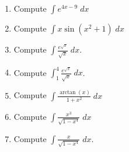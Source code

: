 \documentclass[11pt,fleqn]{article}
\newcommand{\be}{\begin{enumerate}}
\newcommand{\ee}{\end{enumerate}}
\begin{document}
\setlength{\parindent}{0cm}
\renewcommand{\headrulewidth}{0pt}
\newcommand{\blank}[1]{\rule{#1}{0.75pt}}
\renewcommand{\d}{\displaystyle}
\vspace*{-0.7in}
\begin{center}
  \Large {}
\end{center}

\be
\item Compute $\d{ \int e^{4x-9}\; dx}$
\vfill
\item Compute $\d \int x \sin(x^2+1)\; dx$
\vfill
\item Compute $\d \int \frac{e^{\sqrt{x}}}{\sqrt{x}}\; dx$.
\vfill
\item Compute $\d \int_1^4 \frac{e^{\sqrt{x}}}{\sqrt{x}}\; dx$.
\vfill
\newpage
\item Compute $\d \int \frac{\arctan(x)}{1+x^2}\;dx$
\vfill

\item Compute $\d \int \frac{x^3}{\sqrt{1-x^4}}\;dx$
\vfill

\item Compute $\d \int \frac{x}{\sqrt{1-x^4}}\;dx$.
\vfill







\ee
\end{document}
